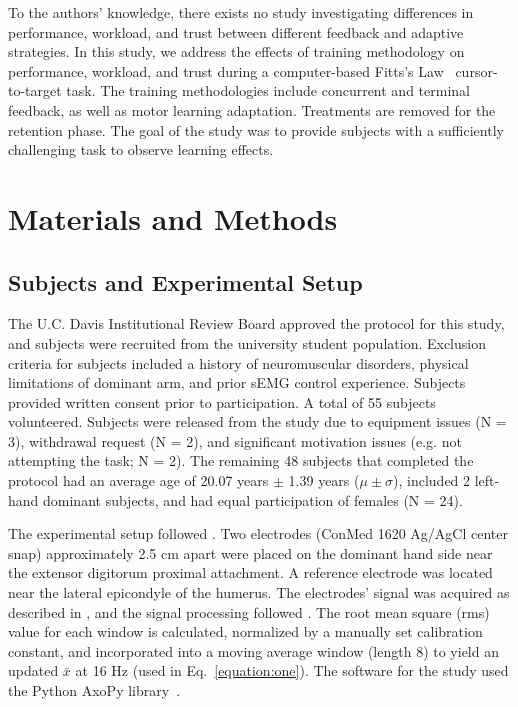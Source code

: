 \begin{mdframed}[hidealllines=true,backgroundcolor=blue!20]
	To the authors' knowledge, there exists no study investigating differences in performance, workload, and trust between different feedback and adaptive strategies.
	In this study, we address the effects of training methodology on performance, workload, and trust during a computer-based Fitts's Law~\citep{RN43} cursor-to-target task.
	The training methodologies include concurrent and terminal feedback, as well as motor learning adaptation.
	Treatments are removed for the retention phase.
	The goal of the study was to provide subjects with a sufficiently challenging task to observe learning effects.

	\section{Materials and Methods}
	\subsection{Subjects and Experimental Setup}

	The U.C. Davis Institutional Review Board approved the protocol for this study, and subjects were recruited from the university student population.
	Exclusion criteria for subjects included a history of neuromuscular disorders, physical limitations of dominant arm, and prior sEMG control experience.
	Subjects provided written consent prior to participation.
	A total of 55 subjects volunteered.
	Subjects were released from the study due to equipment issues (N = 3), withdrawal request (N = 2), and significant motivation issues (e.g. not attempting the task; N = 2).
	The remaining 48 subjects that completed the protocol had an average age of 20.07 years $\pm$ 1.39 years ($\mu\pm\sigma$), included 2 left-hand dominant subjects, and had equal participation of females (N = 24).

	The experimental setup followed \citeauthor{RN44}.
	Two electrodes (ConMed 1620 Ag/AgCl center snap) approximately 2.5 cm apart were placed on the dominant hand side near the extensor digitorum proximal attachment.
	A reference electrode was located near the lateral epicondyle of the humerus.
	The electrodes' signal was acquired as described in \citet{RN44}, and the signal processing followed \citet{RN45}.
	The root mean square (rms) value for each window is calculated, normalized by a manually set calibration constant, and incorporated into a moving average window (length 8) to yield an updated $\bar{x}$ at 16 Hz (used in Eq.~\ref{equation:one}).
	The software for the study used the Python AxoPy library~\citep{RN46}.


\end{mdframed}
